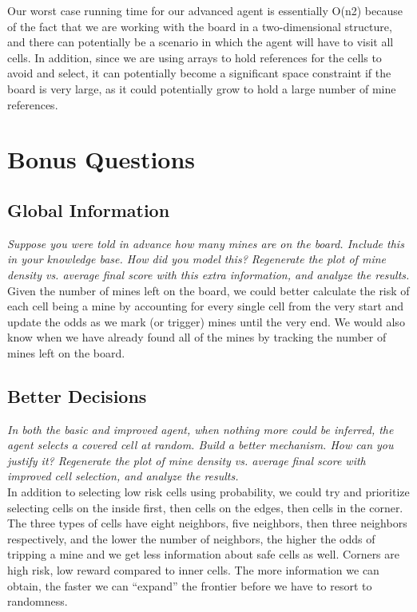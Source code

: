 \documentclass[11pt]{article} %
\begin{document}
Our worst case running time for our advanced agent is essentially O(n2) because of the fact that we are working with the board in a two-dimensional structure, and there can potentially be a scenario in which the agent will have to visit all cells. In addition, since we are using arrays to hold references for the cells to avoid and select, it can potentially become a significant space constraint if the board is very large, as it could potentially grow to hold a large number of mine references.\\

\section{\textbf{Bonus Questions}}

\subsection{Global Information}

\textit{Suppose you were told in advance how many mines are on the board. Include this in your knowledge base. How did you model this? Regenerate the plot of mine density vs. average final score with this extra information, and analyze the results.}\\

Given the number of mines left on the board, we could better calculate the risk of each cell being a mine by accounting for every single cell from the very start and update the odds as we mark (or trigger) mines until the very end. We would also know when we have already found all of the mines by tracking the number of mines left on the board.

\subsection{Better Decisions}

\textit{In both the basic and improved agent, when nothing more could be inferred, the agent selects a covered cell at random. Build a better mechanism. How can you justify it? Regenerate the plot of mine density vs. average final score with improved cell selection, and analyze the results.}\\

In addition to selecting low risk cells using probability, we could try and prioritize selecting cells on the inside first, then cells on the edges, then cells in the corner. The three types of cells have eight neighbors, five neighbors, then three neighbors respectively, and the lower the number of neighbors, the higher the odds of tripping a mine and we get less information about safe cells as well. Corners are high risk, low reward compared to inner cells. The more information we can obtain, the faster we can “expand” the frontier before we have to resort to randomness.
\end{document}
